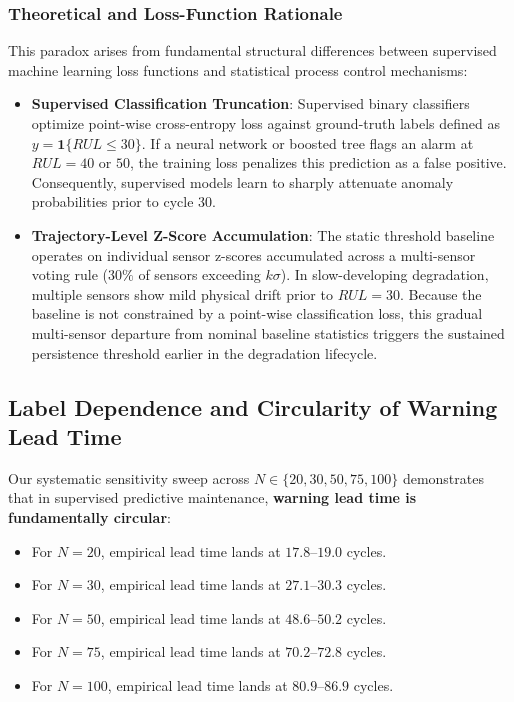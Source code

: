 \subsubsection{Theoretical and Loss-Function Rationale}
This paradox arises from fundamental structural differences between supervised machine learning loss functions and statistical process control mechanisms:
\begin{itemize}
    \item \textbf{Supervised Classification Truncation}: Supervised binary classifiers optimize point-wise cross-entropy loss against ground-truth labels defined as $y = \mathbf{1}\{RUL \le 30\}$. If a neural network or boosted tree flags an alarm at $RUL = 40$ or $50$, the training loss penalizes this prediction as a false positive. Consequently, supervised models learn to sharply attenuate anomaly probabilities prior to cycle 30.
    \item \textbf{Trajectory-Level Z-Score Accumulation}: The static threshold baseline operates on individual sensor z-scores accumulated across a multi-sensor voting rule ($30\%$ of sensors exceeding $k\sigma$). In slow-developing degradation, multiple sensors show mild physical drift prior to $RUL = 30$. Because the baseline is not constrained by a point-wise classification loss, this gradual multi-sensor departure from nominal baseline statistics triggers the sustained persistence threshold earlier in the degradation lifecycle.
\end{itemize}

\subsection{Label Dependence and Circularity of Warning Lead Time}
Our systematic sensitivity sweep across $N \in \{20, 30, 50, 75, 100\}$ demonstrates that in supervised predictive maintenance, \textbf{warning lead time is fundamentally circular}:
\begin{itemize}
    \item For $N=20$, empirical lead time lands at $17.8$--$19.0$ cycles.
    \item For $N=30$, empirical lead time lands at $27.1$--$30.3$ cycles.
    \item For $N=50$, empirical lead time lands at $48.6$--$50.2$ cycles.
    \item For $N=75$, empirical lead time lands at $70.2$--$72.8$ cycles.
    \item For $N=100$, empirical lead time lands at $80.9$--$86.9$ cycles.
\end{itemize}

